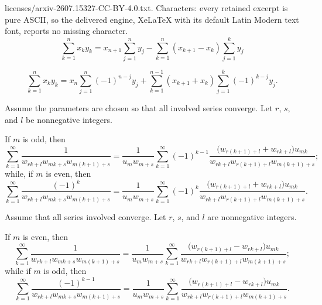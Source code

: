 \documentclass[10pt,a4paper]{amsart}
\begin{document}
licenses/arxiv-2607.15327-CC-BY-4.0.txt. Characters: every retained excerpt is pure ASCII, so the delivered engine, XeLaTeX with its default Latin Modern text font, reports no missing character.
	\begin{equation}\label{Lemma1_1}
		\sum_{k=1}^n x_k y_k = x_{n+1} \sum_{j=1}^n y_j - \sum_{k=1}^n (x_{k+1} - x_k)\sum_{j=1}^k y_j
		\end{equation}

	\begin{equation}\label{Lemma1_2}
		\sum_{k=1}^n x_k y_k = x_{n} \sum_{j=1}^n (-1)^{n-j} y_j + \sum_{k=1}^{n-1} (x_{k+1} + x_k)\sum_{j=1}^k (-1)^{k-j} y_j.
		\end{equation}

\begin{theorem}\label{thm:main_transform}
	Assume the parameters are chosen so that all involved series converge. Let $r$, $s$, and $l$ be nonnegative integers.
	
	If $m$ is odd, then
		\begin{equation}\label{Th1_1}
		\sum_{k=1}^\infty
		\frac{1}{w_{rk+l}w_{mk+s}w_{m(k+1)+s}}
		=
		\frac{1}{u_m w_{m+s}}
		\sum_{k=1}^\infty (-1)^{k-1}
		\frac{\bigl(w_{r(k+1)+l}+w_{rk+l}\bigr)u_{mk}}
		{w_{rk+l} w_{r(k+1)+l} w_{m(k+1)+s}};
		\end{equation}
	while, if $m$ is even, then
		\begin{equation}\label{Th1_2}
		\sum_{k=1}^\infty
		\frac{(-1)^k}{w_{rk+l}w_{mk+s}w_{m(k+1)+s}}
		=
		\frac{1}{u_m w_{m+s}}
		\sum_{k=1}^\infty (-1)^k
		\frac{\bigl(w_{r(k+1)+l}+w_{rk+l}\bigr)u_{mk}}
		{w_{rk+l} w_{r(k+1)+l} w_{m(k+1)+s}}.
		\end{equation}
\end{theorem}

\begin{theorem}\label{thm:second_transform}
	Assume that all series involved converge. Let $r$, $s$, and $l$ are nonnegative integers.
	
	If $m$ is even, then
		\begin{equation}\label{Th2_1}
		\sum_{k=1}^\infty 
		\frac{1}{w_{rk+l}w_{mk+s}w_{m(k+1)+s}} 
		= \frac{1}{u_m w_{m+s}}\sum_{k=1}^\infty 
		\frac{\big(w_{r(k+1)+l}- w_{rk+l}\big)u_{mk}}{w_{rk+l} w_{r(k+1)+l} w_{m(k+1)+s}};
		\end{equation}
	while if $m$ is odd, then
		\begin{equation}\label{Th2_2}
		\sum_{k=1}^\infty 
		\frac{(-1)^{k-1}}{w_{rk+l}w_{mk+s}w_{m(k+1)+s}} 
		= \frac{1}{u_m w_{m+s}}\sum_{k=1}^\infty 
		\frac{\big(w_{r(k+1)+l}- w_{rk+l}\big)u_{mk}}{w_{rk+l} w_{r(k+1)+l} w_{m(k+1)+s}}.
		\end{equation}
\end{theorem}
\end{document}
